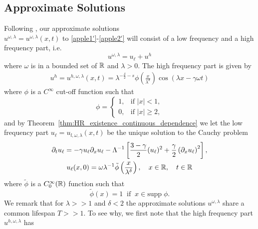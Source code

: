 \subsection{Approximate Solutions}
Following \cite{Himonas:2009fk}, our approximate solutions
\\ $u^{\omega, \lambda} = u^{\omega,
\lambda}(x,t)$ to \eqref{apple1'}-\eqref{apple2'} will
consist of a low frequency and a high frequency part,
i.e.
%
%
%
%
\begin{equation}
\label{apple1}
u^{\omega,\lambda} = u_\ell + u^h
\end{equation}
%
%
%
%
where $\omega$ is in a bounded set of $\mathbb{R}$ and $\lambda > 0$. The high frequency part is given by 
%
%
%
%
\begin{equation}
\begin{split}
u^h = u^{h,\omega,\lambda}(x,t) =
\lambda^{-\frac{\delta}{2} -s}
\phi \left (\frac{x}{\lambda^\delta}\right )
\cos(\lambda x - \gamma \omega t)
\end{split}
\end{equation}
%
%
%
%
where $\phi$ is a $C^\infty$ cut-off function such that
%
%
%
%
\begin{equation*}
\phi = \begin{cases}
1, &\text{if $|x|<1$,} \\
0, &\text{if $|x| \ge 2,$} \end{cases}
\end{equation*}
%
%
%
%
and by Theorem~\ref{thm:HR_existence_continuous_dependence} 
we let the low frequency part $u_\ell = u_{l,
\omega, \lambda}(x,t)$ be the unique solution to the Cauchy problem
%
%
\begin{gather}
\label{u-l-apple1'}
\partial_t u_\ell = -\gamma u_\ell \partial_x u_\ell -
\Lambda^{-1} \left[ \frac{3-\gamma}{2}(u_\ell)^2 +
\frac{\gamma}{2} \left( \partial_x u_\ell \right)^2
\right],
\\
u_\ell(x,0) = \omega \lambda^{-1} \tilde{\phi} \left(
\frac{x}{\lambda^{\delta}}
\right), \quad x \in \mathbb{R}, \quad t \in \mathbb{R}
\label{apple1ah}
\end{gather}
%
%
%
%
where $\tilde{\phi}$ is a $C^{\infty}_0(\mathbb{R})$ function such that
%
%
%
%
\begin{equation}
\label{apple1ah7}
\tilde{\phi}(x) = 1 \; \;  \text{if} \; \;
x \in \text{supp} \; \phi.
\end{equation}
%
%
%
%
We remark that for $\lambda >>1$ and $\delta < 2$ the approximate solutions 
$u^{\omega, \lambda}$ share a common lifespan $T >> 1$. To see why, we 
first note that the high frequency part $u^{h, \omega, \lambda}$ has 
